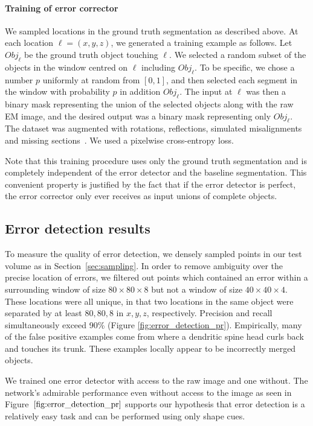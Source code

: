 \documentclass{article}
\begin{document}
\paragraph{Training of error corrector} We sampled locations in the ground truth
segmentation as described above. At each location $\ell = (x,y,z)$, we generated
a training example as follows. Let $Obj_\ell$ be the ground truth object
touching $\ell$. We selected a random subset of the objects in the window
centred on $\ell$ including $Obj_\ell$. To be specific, we chose a number $p$
uniformly at random from $[0,1]$, and then selected each segment in the window
with probability $p$ in addition $Obj_\ell$. The input at $\ell$ was then a
binary mask representing the union of the selected objects along with the raw EM
image, and the desired output was a binary mask representing only $Obj_\ell$.
The dataset was augmented with rotations, reflections, simulated misalignments
and missing sections~\cite{kisuk}. We used a pixelwise cross-entropy loss.

Note that this training procedure uses only the ground truth segmentation and is completely independent of the error detector and the baseline segmentation. This convenient property is justified by the fact that if the error detector is perfect, the error corrector only ever receives as input unions of complete objects.

\subsection{Error detection results}
\label{sec:detection_results}

To measure the quality of error detection, we densely sampled points in our test
volume as in Section~\ref{sec:sampling}. In order to remove ambiguity over the
precise location of errors, we filtered out points which contained an error
within a surrounding window of size $80\times80\times 8$ but not a window of
size $40\times 40 \times 4$. These locations were all unique, in that two
locations in the same object were separated by at least $80,80,8$ in $x,y,z$,
respectively. Precision and recall simultaneously exceed 90\% (Figure
\ref{fig:error_detection_pr}). Empirically, many of the false positive examples
come from where a dendritic spine head curls back and touches its trunk. These
examples locally appear to be incorrectly merged objects.

We trained one error detector with access to the raw image and one without. The
network's admirable performance even without access to the image as seen in
Figure~$\ref{fig:error_detection_pr}$ supports our hypothesis that error
detection is a relatively easy task and can be performed using only shape cues.
\end{document}
